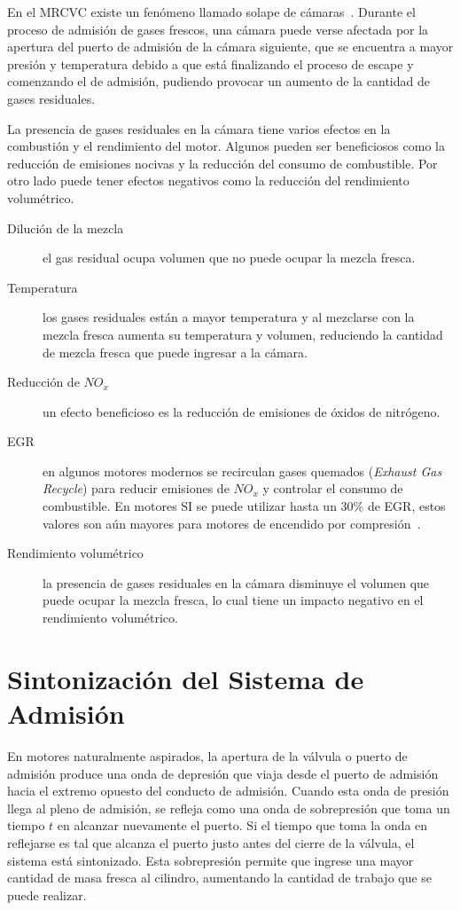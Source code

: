 
En el MRCVC existe un fenómeno llamado solape de cámaras~\parencite{lopez13}.
%
Durante el proceso de admisión de gases frescos, una cámara puede verse afectada
por la apertura del puerto de admisión de la cámara siguiente, que se encuentra
a mayor presión y temperatura debido a que está finalizando el proceso de escape
y comenzando el de admisión, pudiendo provocar un aumento de la cantidad de gases
residuales.


La presencia de gases residuales en la cámara tiene varios efectos en la
combustión y el rendimiento del motor.
%
Algunos pueden ser beneficiosos como la reducción de emisiones nocivas y la
reducción del consumo de combustible.
%
Por otro lado puede tener efectos negativos como la reducción del rendimiento
volumétrico.
%
\begin{description}
  \item[Dilución de la mezcla] el gas residual ocupa volumen que no puede ocupar la mezcla fresca.
  \item[Temperatura] los gases residuales están a mayor temperatura y al mezclarse con la mezcla fresca aumenta su temperatura y volumen, reduciendo la cantidad de mezcla fresca que puede ingresar a la cámara.
  \item[Reducción de $NO_{x}$] un efecto beneficioso es la reducción de emisiones de óxidos de nitrógeno.
  \item[EGR] en algunos motores modernos se recirculan gases quemados (\textit{Exhaust Gas Recycle}) para reducir emisiones de $NO_{x}$ y controlar el consumo de combustible. En motores SI se puede utilizar hasta un 30\% de EGR, estos valores son aún mayores para motores de encendido por compresión~\parencite{heywood}.
  \item[Rendimiento volumétrico] la presencia de gases residuales en la cámara disminuye el volumen que puede ocupar la mezcla fresca, lo cual tiene un impacto negativo en el rendimiento volumétrico.
\end{description}

\section{Sintonización del Sistema de Admisión}\label{cap2_sec_sintonia_admision}
%
En motores naturalmente aspirados, la apertura de la válvula o puerto de
admisión produce una onda de depresión que viaja desde el puerto de admisión
hacia el extremo opuesto del conducto de admisión.
%
Cuando esta onda de presión llega al pleno de admisión, se refleja como una
onda de sobrepresión que toma un tiempo $t$ en alcanzar nuevamente el puerto.
%
Si el tiempo que toma la onda en reflejarse es tal que alcanza el puerto justo
antes del cierre de la válvula, el sistema está sintonizado.
%
Esta sobrepresión permite que ingrese una mayor cantidad de masa fresca al
cilindro, aumentando la cantidad de trabajo que se puede realizar.

